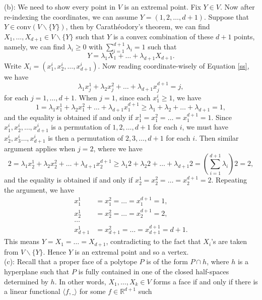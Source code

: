 \documentclass[12pt,reqno]{amsart}
\theoremstyle{definition}
\newcommand{\RR}{\mathbb{R}}
\newcommand{\conv}[1]{\mathrm{conv}(#1)}
\newcommand{\la}{\langle}
\newcommand{\ra}{\rangle}
\begin{document}
(b): We need to show every point in $V$ is an extremal point. Fix $Y\in V$. Now after re-indexing the coordinates, we can assume $Y=(1,2,\dots, d+1)$. Suppose that $Y\in \conv{V\backslash \{Y\}}$, then by Carath\'eodory's theorem, we can find $X_1,\dots,X_{d+1}\in V\backslash \{Y\}$ such that $Y$ is a convex combination of these $d+1$ points, namely, we can find $\lambda_i\geq 0$ with $\sum_{i=1}^{d+1}\lambda_i =1$ such that \begin{equation}\label{ss}
  Y= \lambda_1 X_1 + \dots + \lambda_{d+1} X_{d+1}.
\end{equation}
Write $X_i=(x_1^{i},x_2^{i},\dots,x_{d+1}^{i})$. Now reading coordinate-wisely of Equation \ref{ss}, we have $$ \lambda_1 x_j^1+\lambda_2 x_j^2+\dots +\lambda_{d+1} x_j^{d+1} = j,$$ for each $j=1,\dots,d+1$. When $j=1$, since each $x_1^{i}\geq 1$, we have $$ 1=  \lambda_1 x_1^1+\lambda_2 x_1^2+\dots +\lambda_{d+1} x_1^{d+1} \geq  \lambda_1 +\lambda_2 +\dots +\lambda_{d+1} = 1,$$ and the equality is obtained if and only if $x_1^1 = x_1^2 =\dots=x_1^{d+1}=1$. Since  $x_1^{i},x_2^{i},\dots,x_{d+1}^{i}$ is a permutation of $1,2,\dots,d+1$ for each $i$, we must have $x_2^{i},x_3^{i}\dots,x_{d+1}^{i}$ is then a permutation of $2,3,\dots,d+1$ for each $i$. Then similar argument applies when $j=2$, where we have $$ 2=  \lambda_1 x_2^1+\lambda_2 x_2^2+\dots +\lambda_{d+1} x_2^{d+1} \geq  \lambda_1 2 +\lambda_2 2 +\dots +\lambda_{d+1}  2= (\sum_{i=1}^{d+1}\lambda_i) 2 =2,$$ and the equality is obtained if and only if $x_2^1 = x_2^2 =\dots=x_2^{d+1}=2$. Repeating  the argument, we have \begin{align*}
  x_1^1     & = x_1^2 =\dots=x_1^{d+1}=1,           \\
  x_2^1     & = x_2^2 =\dots=x_2^{d+1}=2,           \\
  \dots     &                                       \\
  x_{d+1}^1 & = x_{d+1}^2 =\dots=x_{d+1}^{d+1}=d+1.
\end{align*}
This means $Y=X_1=\dots=X_{d+1}$, contradicting to the fact that $X_i$'s are taken from $V\backslash \{Y\}$. Hence $Y$ is an extremal point and so a vertex.\\


(c): Recall that a proper face of a polytope $P$ is of the form $P\cap h$, where $h$ is a hyperplane such that $P$ is fully contained in one of the closed half-spaces determined by $h$. In other words, $X_1,\dots, X_k\in V$ forms a face if and only if there is a linear functional $\la f, \_ \ra$ for some $f\in \RR^{d+1}$ such
\end{document}
